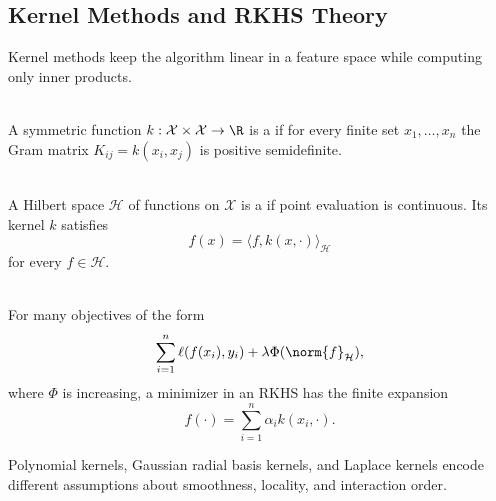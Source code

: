 \subsection{Kernel Methods and RKHS Theory}

Kernel methods keep the algorithm linear in a feature space while computing only inner products.

\begin{definition} \label{def:sl-positive-definite-kernel} \\
A symmetric function $k:\mathcal{X}\times\mathcal{X}\to\R$ is a  if for every finite set $x_1,\ldots,x_n$ the Gram matrix $K_{ij}=k(x_i,x_j)$ is positive semidefinite.
\end{definition}

\begin{definition} \label{def:sl-rkhs} \\
A Hilbert space $\mathcal{H}$ of functions on $\mathcal{X}$ is a  if point evaluation is continuous.  Its kernel $k$ satisfies
\[
f(x)=\langle f,k(x,\cdot)\rangle_{\mathcal{H}}
\]
for every $f\in\mathcal{H}$.
\end{definition}

\begin{theorem} \label{thm:sl-representer-theorem-form} \\
For many objectives of the form
\[
\sum_{i=1}^n\ell(f(x_i),y_i)+\lambda\Phi(\norm{f}_{\mathcal{H}}),
\]
where $\Phi$ is increasing, a minimizer in an RKHS has the finite expansion
\[
f(\cdot)=\sum_{i=1}^n\alpha_i k(x_i,\cdot).
\]
\end{theorem}

\begin{example} \label{ex:sl-common-kernels} 
Polynomial kernels, Gaussian radial basis kernels, and Laplace kernels encode different assumptions about smoothness, locality, and interaction order.
\end{example}
